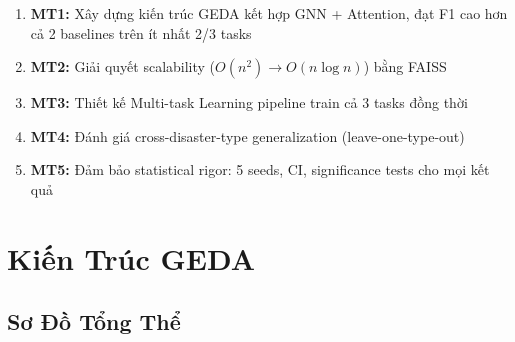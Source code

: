 \documentclass[12pt,a4paper]{article}
\begin{document}
\begin{enumerate}[leftmargin=*]
  \item \textbf{MT1:} Xây dựng kiến trúc GEDA kết hợp GNN + Attention, đạt F1 cao hơn cả 2 baselines trên ít nhất 2/3 tasks
  \item \textbf{MT2:} Giải quyết scalability ($O(n^2) \rightarrow O(n \log n)$) bằng FAISS
  \item \textbf{MT3:} Thiết kế Multi-task Learning pipeline train cả 3 tasks đồng thời
  \item \textbf{MT4:} Đánh giá cross-disaster-type generalization (leave-one-type-out)
  \item \textbf{MT5:} Đảm bảo statistical rigor: 5 seeds, CI, significance tests cho mọi kết quả
\end{enumerate}

\section{Kiến Trúc GEDA}

\subsection{Sơ Đồ Tổng Thể}
\end{document}
